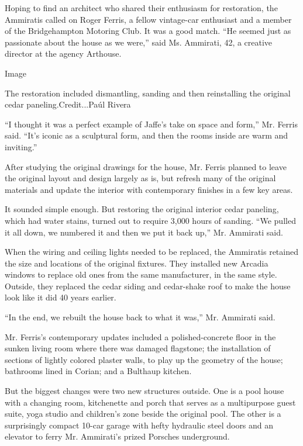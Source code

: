 Hoping to find an architect who shared their enthusiasm for restoration,
the Ammiratis called on Roger Ferris, a fellow vintage-car enthusiast
and a member of the Bridgehampton Motoring Club. It was a good match.
``He seemed just as passionate about the house as we were,'' said Ms.
Ammirati, 42, a creative director at the agency Arthouse.

Image

The restoration included dismantling, sanding and then reinstalling the
original cedar paneling.Credit...Paúl Rivera

``I thought it was a perfect example of Jaffe's take on space and
form,'' Mr. Ferris said. ``It's iconic as a sculptural form, and then
the rooms inside are warm and inviting.''

After studying the original drawings for the house, Mr. Ferris planned
to leave the original layout and design largely as is, but refresh many
of the original materials and update the interior with contemporary
finishes in a few key areas.

It sounded simple enough. But restoring the original interior cedar
paneling, which had water stains, turned out to require 3,000 hours of
sanding. ``We pulled it all down, we numbered it and then we put it back
up,'' Mr. Ammirati said.

When the wiring and ceiling lights needed to be replaced, the Ammiratis
retained the size and locations of the original fixtures. They installed
new Arcadia windows to replace old ones from the same manufacturer, in
the same style. Outside, they replaced the cedar siding and cedar-shake
roof to make the house look like it did 40 years earlier.

``In the end, we rebuilt the house back to what it was,'' Mr. Ammirati
said.

Mr. Ferris's contemporary updates included a polished-concrete floor in
the sunken living room where there was damaged flagstone; the
installation of sections of lightly colored plaster walls, to play up
the geometry of the house; bathrooms lined in Corian; and a Bulthaup
kitchen.

But the biggest changes were two new structures outside. One is a pool
house with a changing room, kitchenette and porch that serves as a
multipurpose guest suite, yoga studio and children's zone beside the
original pool. The other is a surprisingly compact 10-car garage with
hefty hydraulic steel doors and an elevator to ferry Mr. Ammirati's
prized Porsches underground.

